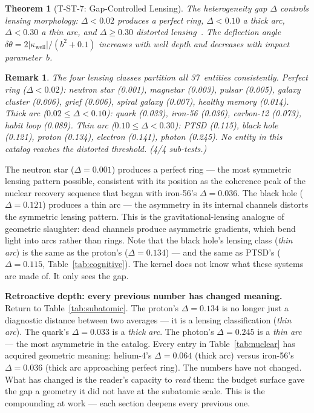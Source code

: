\documentclass[
  aps,
  prd,
  twocolumn,
  superscriptaddress,
  nofootinbib,
  floatfix
]{revtex4-2}
\newtheorem{theorem}{Theorem}
\newtheorem{remark}{Remark}
\begin{document}
\begin{theorem}[T-ST-7: Gap-Controlled Lensing]\label{thm:T7}
The heterogeneity gap $\Delta$ controls lensing morphology:
$\Delta < 0.02$ produces a perfect ring, $\Delta < 0.10$ a
thick arc, $\Delta < 0.30$ a thin arc, and $\Delta \geq 0.30$
distorted
lensing~\cite{schneider1992gravitational,refsdal1964gravitational}.
The deflection angle
$\delta\theta = 2|\kappa_{\mathrm{well}}|/(b^2 + 0.1)$
increases with well depth and decreases with impact
parameter~$b$.
\end{theorem}

\begin{remark}
The four lensing classes partition all 37~entities
consistently.  Perfect ring ($\Delta < 0.02$): neutron star
(0.001), magnetar (0.003), pulsar (0.005), galaxy cluster
(0.006), grief (0.006), spiral galaxy (0.007), healthy memory
(0.014).  Thick arc ($0.02 \leq \Delta < 0.10$): quark (0.033),
iron-56 (0.036), carbon-12 (0.073), habit loop (0.089).
Thin arc ($0.10 \leq \Delta < 0.30$): PTSD (0.115), black
hole (0.121), proton (0.134), electron (0.141), photon (0.245).
No entity in this catalog reaches the distorted threshold.
(4/4 sub-tests.)
\end{remark}

The neutron star ($\Delta = 0.001$) produces a perfect ring ---
the most symmetric lensing pattern possible, consistent with
its position as the coherence peak of the nuclear recovery
sequence that began with iron-56's $\Delta = 0.036$.
The black hole ($\Delta = 0.121$) produces a thin arc ---
the asymmetry in its internal channels distorts the symmetric
lensing pattern.  This is the gravitational-lensing analogue
of geometric slaughter: dead channels produce asymmetric
gradients, which bend light into arcs rather than rings.
Note that the black hole's lensing class (\emph{thin arc})
is the same as the proton's ($\Delta = 0.134$) --- and
the same as PTSD's ($\Delta = 0.115$, Table~\ref{tab:cognitive}).  The
kernel does not know what these systems are made of.  It
only sees the gap.

\textbf{Retroactive depth: every previous number has changed
meaning.}
Return to Table~\ref{tab:subatomic}.  The proton's
$\Delta = 0.134$ is no longer just a diagnostic distance
between two averages --- it is a lensing classification
(\emph{thin arc}).  The quark's $\Delta = 0.033$ is a
\emph{thick arc}.  The photon's $\Delta = 0.245$ is a
\emph{thin arc} --- the most asymmetric in the catalog.  Every entry in
Table~\ref{tab:nuclear} has acquired geometric meaning:
helium-4's $\Delta = 0.064$ (thick arc) versus iron-56's
$\Delta = 0.036$ (thick arc approaching perfect ring).
The numbers have not changed.  What has changed is the reader's
capacity to \emph{read} them: the budget surface gave the gap
a geometry it did not have at the subatomic scale.  This is the
compounding at work --- each section deepens every previous one.
\end{document}
